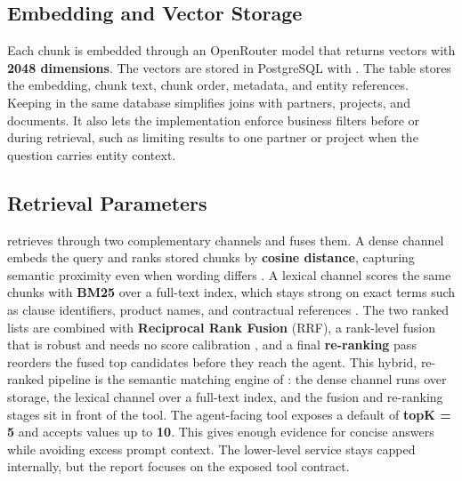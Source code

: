 \subsection{Embedding and Vector Storage}
\label{subsec:chapter7-embedding-storage}
Each chunk is embedded through an OpenRouter model that returns vectors with \textbf{2048 dimensions}. The vectors are stored in PostgreSQL with . The  table stores the embedding, chunk text, chunk order, metadata, and entity references.
Keeping  in the same database simplifies joins with partners, projects, and documents. It also lets the implementation enforce business filters before or during retrieval, such as limiting results to one partner or project when the question carries entity context.
\subsection{Retrieval Parameters}
\label{subsec:chapter7-retrieval-parameters}
\projectname{} retrieves through two complementary channels and fuses them. A dense channel embeds the query and ranks stored chunks by \textbf{cosine distance}, capturing semantic proximity even when wording differs . A lexical channel scores the same chunks with \textbf{BM25} over a full-text index, which stays strong on exact terms such as clause identifiers, product names, and contractual references . The two ranked lists are combined with \textbf{Reciprocal Rank Fusion} (RRF), a rank-level fusion that is robust and needs no score calibration , and a final \textbf{re-ranking} pass reorders the fused top candidates before they reach the agent. This hybrid, re-ranked pipeline is the semantic matching engine of \projectname{}: the dense channel runs over  storage, the lexical channel over a full-text index, and the fusion and re-ranking stages sit in front of the  tool.
The agent-facing tool exposes a default of \textbf{topK = 5} and accepts values up to \textbf{10}. This gives enough evidence for concise answers while avoiding excess prompt context. The lower-level service stays capped internally, but the report focuses on the exposed tool contract.

